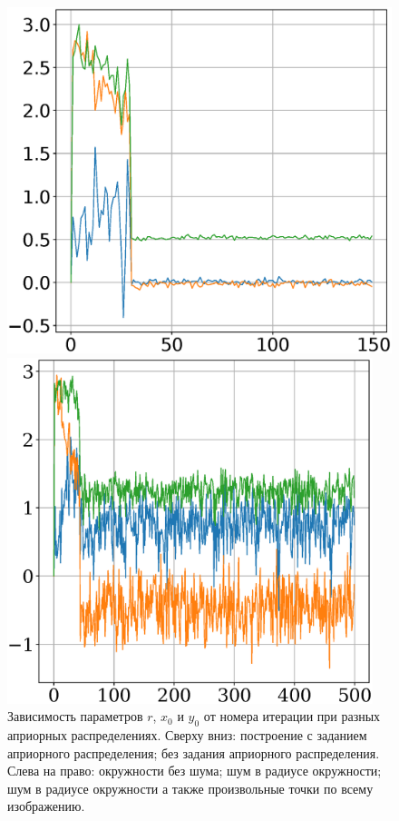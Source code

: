 \documentclass[12pt, twoside]{article}
\numberwithin{equation}{section}
\begin{document}
\begin{figure}[h]
\begin{minipage}{.32\textwidth}
\end{minipage}
\begin{minipage}{.32\textwidth}
\hspace{-2.1mm}
      \includegraphics[width = \textwidth]{figures/901noise.eps}
\end{minipage}
\begin{minipage}{.32\textwidth}
\hspace{-2mm}
      \includegraphics[width = 0.95\textwidth]{figures/902noise.eps}
\end{minipage}
\caption{Зависимость параметров $r$, $x_0$ и $y_0$ от номера итерации при разных априорных распределениях. Сверху вниз: построение с заданием априорного распределения; без задания априорного распределения. Слева на право: окружности без шума; шум в радиусе окружности; шум в радиусе окружности а также произвольные точки по всему изображению.}
\label{ce:fig4}
\end{figure}
\end{document}
